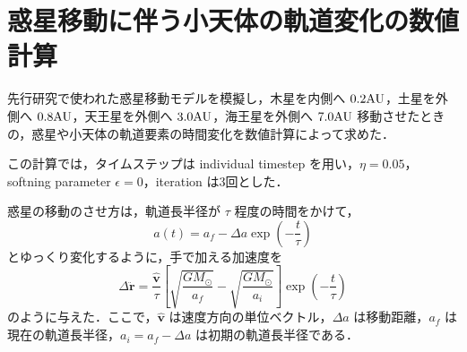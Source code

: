 \documentclass[11pt,a4paper,oneside,onecolumn]{jreport}
\begin{document}
\section{惑星移動に伴う小天体の軌道変化の数値計算}
先行研究で使われた惑星移動モデル\cite{Minton}\cite{Malhotra}を模擬し，木星を内側へ $0.2 {\rm AU}$，土星を外側へ $0.8 {\rm AU}$，天王星を外側へ $3.0 {\rm AU}$，海王星を外側へ $7.0 {\rm AU}$ 移動させたときの，惑星や小天体の軌道要素の時間変化を数値計算によって求めた．

この計算では，タイムステップは individual timestep を用い，$\eta = 0.05$，softning parameter $\epsilon = 0$，iteration は3回とした．

惑星の移動のさせ方は，軌道長半径が $\tau$ 程度の時間をかけて，
\begin{equation}
a (t) = a_f - \Delta a \exp \left( - \frac{t}{\tau} \right) \label{eq:a(t)}
\end{equation}
とゆっくり変化するように，手で加える加速度を
\begin{equation}
\Delta \ddot{\bm r} = \frac{\hat{{\bm v}}}{\tau} \left[ \sqrt{\frac{G M_{\odot}}{a_f}} - \sqrt{\frac{G M_{\odot}}{a_i}} \right] \exp \left(- \frac{t}{\tau} \right) \label{eq:delta_rddot}
\end{equation}
のように与えた\cite{Malhotra}．ここで，$\hat{{\bm v}}$ は速度方向の単位ベクトル，$\Delta a$ は移動距離，$a_f$ は現在の軌道長半径，$a_i = a_f - \Delta a$ は初期の軌道長半径である．
\end{document}

